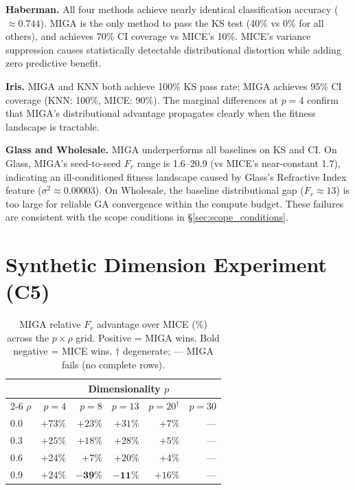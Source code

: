 \textbf{Haberman.} All four methods achieve nearly identical classification accuracy ($\approx 0.744$). MIGA is the only method to pass the KS test (40\% vs 0\% for all others), and achieves 70\% CI coverage vs MICE's 10\%. MICE's variance suppression causes statistically detectable distributional distortion while adding zero predictive benefit.

\textbf{Iris.} MIGA and KNN both achieve 100\% KS pass rate; MIGA achieves 95\% CI coverage (KNN: 100\%, MICE: 90\%). The marginal differences at $p=4$ confirm that MIGA's distributional advantage propagates clearly when the fitness landscape is tractable.

\textbf{Glass and Wholesale.} MIGA underperforms all baselines on KS and CI. On Glass, MIGA's seed-to-seed $F_r$ range is 1.6--20.9 (vs MICE's near-constant 1.7), indicating an ill-conditioned fitness landscape caused by Glass's Refractive Index feature ($\sigma^2 \approx 0.00003$). On Wholesale, the baseline distributional gap ($F_r \approx 13$) is too large for reliable GA convergence within the compute budget. These failures are consistent with the scope conditions in \S\ref{sec:scope_conditions}.

\section{Synthetic Dimension Experiment (C5)}
\label{sec:synthetic_dim}

\begin{table}[h]
\caption{MIGA relative $F_r$ advantage over MICE (\%) across the $p \times \rho$ grid. Positive = MIGA wins. Bold negative = MICE wins. $\dagger$ degenerate; --- MIGA fails (no complete rows).}
\label{tab:synthetic_dim}
\centering
\begin{tabular}{lrrrrr}
\toprule
 & \multicolumn{5}{c}{\textbf{Dimensionality} $p$} \\
\cmidrule{2-6}
$\rho$ & $p=4$ & $p=8$ & $p=13$ & $p=20^\dagger$ & $p=30$ \\
\midrule
0.0 & $+73\%$ & $+23\%$ & $+31\%$ & $+7\%$ & --- \\
0.3 & $+25\%$ & $+18\%$ & $+28\%$ & $+5\%$ & --- \\
0.6 & $+24\%$ & $+7\%$  & $+20\%$ & $+4\%$ & --- \\
0.9 & $+24\%$ & $\mathbf{-39\%}$ & $\mathbf{-11\%}$ & $+16\%$ & --- \\
\bottomrule
\end{tabular}
\end{table}

